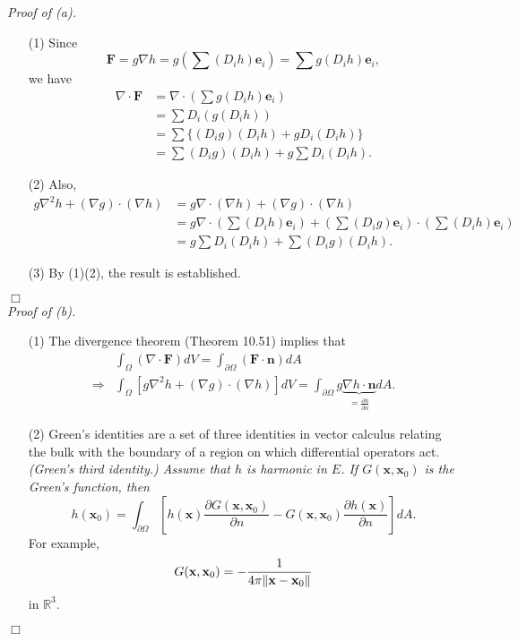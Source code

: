 \documentclass{article}
\begin{document}
\emph{Proof of (a).}
\begin{enumerate}
\item[(1)]
  Since
  \[
    \mathbf{F}
    = g \nabla h
    = g \left(\sum (D_i h)\mathbf{e}_i \right)
    = \sum g(D_i h)\mathbf{e}_i,
  \]
  we have
  \begin{align*}
    \nabla \cdot \mathbf{F}
    &= \nabla \cdot \left( \sum g(D_i h)\mathbf{e}_i \right) \\
    &= \sum D_i(g(D_i h)) \\
    &= \sum \{ (D_i g)(D_i h) + g D_i(D_i h) \} \\
    &= \sum (D_i g)(D_i h) + g \sum D_i(D_i h).
  \end{align*}

\item[(2)]
  Also,
  \begin{align*}
    g \nabla^2 h + (\nabla g) \cdot (\nabla h)
    &= g \nabla \cdot (\nabla h) + (\nabla g) \cdot (\nabla h) \\
    &= g \nabla \cdot \left(\sum (D_i h)\mathbf{e}_i \right)
      + \left(\sum (D_i g)\mathbf{e}_i \right) \cdot \left(\sum (D_i h)\mathbf{e}_i \right) \\
    &= g \sum D_i(D_i h) + \sum (D_i g)(D_i h).
  \end{align*}

\item[(3)]
  By (1)(2), the result is established.
\end{enumerate}
$\Box$ \\



\emph{Proof of (b).}
\begin{enumerate}
\item[(1)]
  The divergence theorem (Theorem 10.51) implies that
  \begin{align*}
    &\int_{\Omega} (\nabla \cdot \mathbf{F}) dV
    = \int_{\partial\Omega} (\mathbf{F} \cdot \mathbf{n}) dA \\
    \Longrightarrow&
    \int_{\Omega} [g \nabla^2 h + (\nabla g) \cdot (\nabla h)] dV
    = \int_{\partial\Omega} g \underbrace{\nabla h \cdot \mathbf{n}}_{=\frac{\partial h}{\partial n}} dA.
  \end{align*}

\item[(2)]
  Green's identities are a set of three identities in vector calculus
  relating the bulk with the boundary of a region on which differential operators act.
  \emph{(Green's third identity.)
  Assume that $h$ is harmonic in $E$.
  If $G(\mathbf{x},\mathbf{x}_0)$ is the Green's function,
  then}
  \[
    h(\mathbf{x}_0)
    = \int_{\partial \Omega}
      \left[ h(\mathbf{x}) \frac{\partial G(\mathbf{x},\mathbf{x}_0)}{\partial n}
      - G(\mathbf{x},\mathbf{x}_0) \frac{\partial h(\mathbf{x})}{\partial n} \right] dA.
  \]
  For example,
  \[
    G(\mathbf{x},\mathbf{x}_0) = -\frac{1}{4\pi\norm{\mathbf{x} - \mathbf{x}_0}}
  \]
  in $\mathbb{R}^3$.
\end{enumerate}
$\Box$ \\
\end{document}
